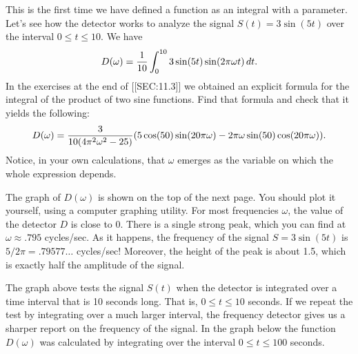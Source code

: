 {{{{	This is the first time we have defined a function as an integral with a parameter.  Let's see how the detector works to analyze the signal $S(t) = 3\sin(5t)$ over the interval $0 \leq t \leq 10$.  We have
	\[
D(\omega) = {1 \over 10} \int_0^{10} 3\sin(5t) \sin(2\pi\omega t)\,dt.
\]
In the exercises at the end of [[SEC:11.3]] we obtained an explicit formula for the integral of the product of two sine functions.  Find that formula and check that it yields the following:
	\[
D(\omega) = {3 \over 10(4\pi^2\omega^2 - 25)}
	(5\cos(50)\sin(20\pi\omega)-2\pi\omega\sin(50)\cos(20\pi\omega)).
\]	
Notice, in your own calculations, that $\omega$ emerges as the variable on which the whole expression depends.   

	The graph of $D(\omega)$ is shown on the top of the next page.  You should plot it yourself, using a computer graphing utility.  
For most frequencies $\omega$, the value of the detector $D$ is close to 0.  There is a single strong peak, which you can find at $\omega \approx .795$ cycles/sec.  As it happens, the frequency of the signal $S = 3\sin(5t)$ is $5/2\pi = .79577\ldots$ cycles/sec!  Moreover, the height of the peak is about 1.5, which is exactly half the amplitude of the signal.

\newpage

\mbox{}
\vspace{80pt}


\vspace{50pt}

	The graph above tests the signal $S(t)$ when the detector is integrated over a time interval that is 10 seconds long.	
That is, $0 \leq t \leq 10$ seconds.  If we repeat the test by integrating over a much larger interval, the frequency detector gives us a sharper report on the frequency of the signal.  In the graph below the function $D(\omega)$ was calculated by integrating over the interval 
$0 \leq t \leq 100$ seconds.
\vspace{100pt}


\vspace{65pt}




}}}}

